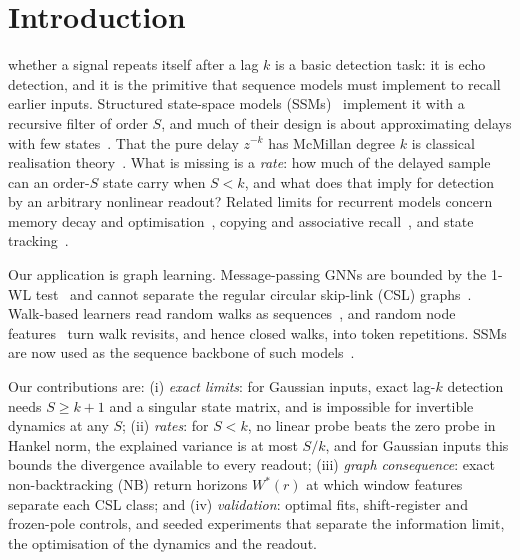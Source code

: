 \documentclass[journal]{IEEEtran}
\theoremstyle{remark}
\begin{document}
\section{Introduction}
 whether a signal repeats itself after a lag $k$ is
a basic detection task: it is echo detection, and it is the primitive that
sequence models must implement to recall earlier inputs. Structured
state-space models (SSMs)~\cite{gu2022s4,gu2022s4d,gu2024mamba} implement it
with a recursive filter of order $S$, and much of their design is about
approximating delays with few states~\cite{voelker2019lmu,gu2020hippo}. That
the pure delay $z^{-k}$ has McMillan degree $k$ is classical realisation
theory~\cite{ho1966kalman,glover1984hankel,aak1971}. What is missing is a
\emph{rate}: how much of the delayed sample can an order-$S$ state carry when
$S<k$, and what does that imply for detection by an arbitrary nonlinear
readout? Related limits for recurrent models concern memory decay and
optimisation~\cite{li2021curse}, copying and associative
recall~\cite{jelassi2024repeat,arora2024zoology}, and state
tracking~\cite{merrill2024illusion}.

Our application is graph learning. Message-passing GNNs are bounded by the
1-WL test~\cite{xu2019gin,morris2019wl} and cannot separate the regular
circular skip-link (CSL) graphs~\cite{murphy2019rp,dwivedi2023benchmarking}.
Walk-based learners read random walks as
sequences~\cite{toenshoff2023crawl,chen2025neuralwalker,kim2025rwnn}, and
random node features~\cite{abboud2021rni,sato2021rf} turn walk revisits,
and hence closed walks, into token repetitions. SSMs are now used as the
sequence backbone of such models~\cite{wang2024graphmamba,behrouz2024graphmamba,chen2025neuralwalker}.

Our contributions are:
(i) \emph{exact limits}: for Gaussian inputs, exact lag-$k$ detection needs
$S\ge k+1$ and a singular state matrix, and is impossible for invertible
dynamics at any $S$;
(ii) \emph{rates}: for $S<k$, no linear probe beats the zero probe in Hankel
norm, the explained variance is at most $S/k$, and for Gaussian inputs this
bounds the divergence available to every readout;
(iii) \emph{graph consequence}: exact non-backtracking (NB) return horizons
$W^*(r)$ at which window features separate each CSL class; and
(iv) \emph{validation}: optimal fits, shift-register and frozen-pole
controls, and seeded experiments that separate the information limit, the
optimisation of the dynamics and the readout.
\end{document}
